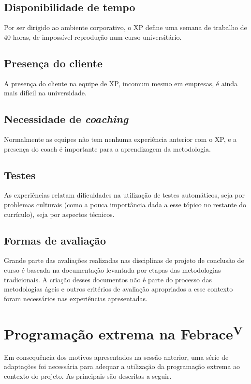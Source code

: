 \documentclass[a4paper,12pt,font=plain,header=plain]{abnt}
\begin{document}
	\subsection{Disponibilidade de tempo}
		Por ser dirigido ao ambiente corporativo, o XP define uma semana de trabalho de 40 horas, de impossível reprodução num curso universitário.

	\subsection{Presença do cliente}
		A presença do cliente na equipe de XP, incomum mesmo em empresas, é ainda mais difícil na universidade.

	\subsection{Necessidade de \textit{coaching}}
		Normalmente as equipes não tem nenhuma experiência anterior com o XP, e a presença do coach é importante para a aprendizagem da metodologia.

	\subsection{Testes}
		As experiências relatam dificuldades na utilização de testes automáticos, seja por problemas culturais (como a pouca importância dada a esse tópico no restante do currículo), seja por aspectos técnicos.

	\subsection{Formas de avaliação}
		Grande parte das avaliações realizadas nas disciplinas de projeto de conclusão de curso é baseada na documentação levantada por etapas das metodologias tradicionais. A criação desses documentos não é parte do processo das metodologias ágeis e outros critérios de avaliação apropriados a esse contexto foram necessários nas experiências apresentadas.

	\section{Programação extrema na Febrace\textsuperscript{V}}
	Em consequência dos motivos apresentados na sessão anterior, uma série de adaptações foi necessária para adequar a utilização da programação extrema ao contexto do projeto. As principais são descritas a seguir.
\end{document}
